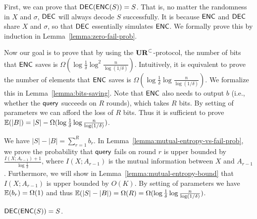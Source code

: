 First, we can prove that $\textsf{DEC}(\textsf{ENC}(S))=S$. 
That is, no matter the randomness in $X$ and $\sigma$, $\textsf{DEC}$ will always decode $S$ successfully. 
It is because $\textsf{ENC}$ and $\textsf{DEC}$ share $X$ and $\sigma$, so that $\textsf{DEC}$ essentially simulates $\textsf{ENC}$. 
We formally prove this by induction in Lemma~\ref{lemma:zero-fail-prob}. 

Now our goal is to prove that by using the $\mathbf{UR}^\subset$-protocol, the number of bits that $\textsf{ENC}$ saves is $\Omega(\log \frac{1}{\delta}\log^2 \frac{n}{\log (1/\delta)} )$. 
Intuitively, it is equivalent to prove the number of elements that $\textsf{ENC}$ saves is $\Omega(\log \frac{1}{\delta}\log \frac{n}{\log (1/\delta)} )$.
We formalize this in Lemma~\ref{lemma:bits-saving}. 
Note that $\textsf{ENC}$ also needs to output $b$ (i.e., whether the $\mathsf{query}$ succeeds on $R$ rounds), which takes $R$ bits. 
By setting of parameters we can afford the loss of $R$ bits. 
Thus it is sufficient to prove $\operatorname*{\mathbb{E}}(|B|)=|S|-\Omega(\log \frac{1}{\delta}\log \frac{n}{\log (1/\delta)})$. 

We have $|S|-|B|=\sum_{r=1}^{R}b_r$. 
In Lemma~\ref{lemma:mutual-entropy-vs-fail-prob}, we prove the probability that $\mathsf{query}$ fails on round $r$ is upper bounded by $\frac{I(X;A_{r-1})+1}{\log \frac{1}{\delta}}$, where $I(X;A_{r-1})$ is the mutual information between $X$ and $A_{r-1}$. 
Furthermore, we will show in Lemma~\ref{lemma:mutual-entropy-bound} that $I(X;A_{r-1})$ is upper bounded by $O(K)$.
By setting of parameters we have $\operatorname*{\mathbb{E}}(b_r)=\Omega(1)$ and thus $\operatorname*{\mathbb{E}}(|S|-|B|)=\Omega(R)=\Omega(\log \frac{1}{\delta}\log \frac{n}{\log (1/\delta)})$.
 
\begin{lemma}\label{lemma:zero-fail-prob}
  $\textsf{DEC}(\textsf{ENC}(S))=S$.
\end{lemma}

